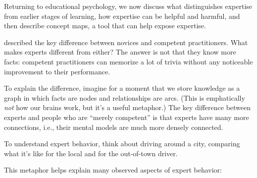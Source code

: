 
Returning to educational psychology, we now discuss what distinguishes
expertise from earlier stages of learning, how expertise can be helpful
and harmful, and then describe concept maps, a tool that can help expose
expertise.


 described
the key difference between novices and competent practitioners. What
makes experts different from either? The answer is not that they know
more facts: competent practitioners can memorize a lot of trivia without
any noticeable improvement to their performance.

To explain the difference, imagine for a moment that we store knowledge
as a graph in which facts are nodes and relationships are arcs. (This is
emphatically \emph{not} how our brains work, but it's a useful
metaphor.) The key difference between experts and people who are
``merely competent'' is that experts have many more connections, i.e.,
their mental models are much more densely connected.

To understand expert behavior, think about driving around a city,
comparing what it's like for the local and for the out-of-town driver.

This metaphor helps explain many observed aspects of expert behavior:

